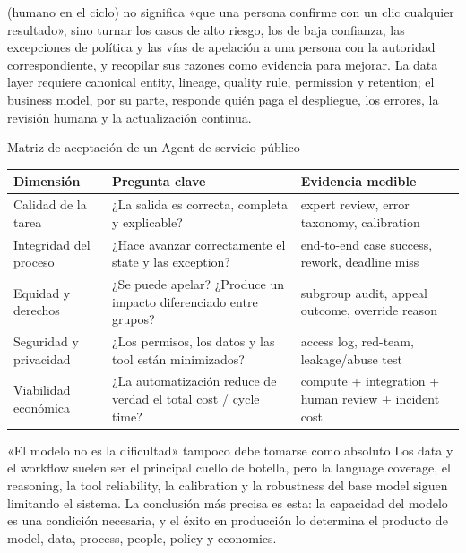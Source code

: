  (humano en el ciclo) no significa «que una persona confirme con un clic cualquier resultado», sino turnar los casos de alto riesgo, los de baja confianza, las excepciones de política y las vías de apelación a una persona con la autoridad correspondiente, y recopilar sus razones como evidencia para mejorar. La data layer requiere canonical entity, lineage, quality rule, permission y retention; el business model, por su parte, responde quién paga el despliegue, los errores, la revisión humana y la actualización continua.

\begin{importantbox}{Matriz de aceptación de un Agent de servicio público}
\begin{tabularx}{\textwidth}{L{0.18\textwidth}L{0.29\textwidth}X}
\toprule
Dimensión & Pregunta clave & Evidencia medible \\
\midrule
Calidad de la tarea & ¿La salida es correcta, completa y explicable? & expert review, error taxonomy, calibration \\
Integridad del proceso & ¿Hace avanzar correctamente el state y las exception? & end-to-end case success, rework, deadline miss \\
Equidad y derechos & ¿Se puede apelar? ¿Produce un impacto diferenciado entre grupos? & subgroup audit, appeal outcome, override reason \\
Seguridad y privacidad & ¿Los permisos, los datos y las tool están minimizados? & access log, red-team, leakage/abuse test \\
Viabilidad económica & ¿La automatización reduce de verdad el total cost / cycle time? & compute + integration + human review + incident cost \\
\bottomrule
\end{tabularx}
\end{importantbox}

\begin{warningbox}{«El modelo no es la dificultad» tampoco debe tomarse como absoluto}
Los data y el workflow suelen ser el principal cuello de botella, pero la language coverage, el reasoning, la tool reliability, la calibration y la robustness del base model siguen limitando el sistema. La conclusión más precisa es esta: la capacidad del modelo es una condición necesaria, y el éxito en producción lo determina el producto de model, data, process, people, policy y economics.
\end{warningbox}


